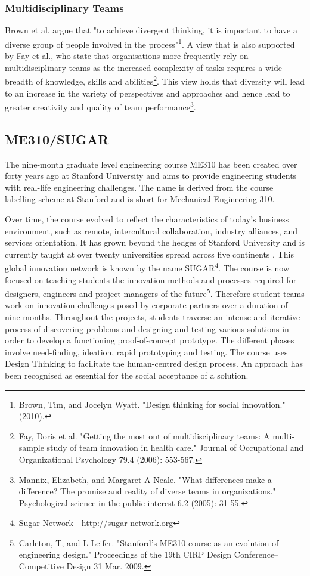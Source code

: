 \subsubsection{Multidisciplinary Teams}

Brown et al. argue that "to achieve divergent thinking, it is important to have a diverse group of people involved in the process"\footnote{Brown, Tim, and Jocelyn Wyatt. "Design thinking for social innovation." (2010).}. A view that is also supported by Fay et al., who state that organisations more frequently rely on multidisciplinary teams as the increased complexity of tasks requires a wide breadth of knowledge, skills and abilities\footnote{Fay, Doris et al. "Getting the most out of multidisciplinary teams: A multi-sample study of team innovation in health care." Journal of Occupational and Organizational Psychology 79.4 (2006): 553-567.}. This view holds that diversity will lead to an increase in the variety of perspectives and approaches and hence lead to greater creativity and quality of team performance\footnote{Mannix, Elizabeth, and Margaret A Neale. "What differences make a difference? The promise and reality of diverse teams in organizations." Psychological science in the public interest 6.2 (2005): 31-55.}.

\subsection{ME310/SUGAR}

The nine-month graduate level engineering course ME310 has been created over forty years ago at Stanford University and aims to provide engineering students with real-life engineering challenges. The name is derived from the course labelling scheme at Stanford and is short for Mechanical Engineering 310.

Over time, the course evolved to reflect the characteristics of today’s business environment, such as remote, intercultural collaboration, industry alliances, and services orientation.  It has grown beyond the hedges of Stanford University and is currently taught at over twenty universities spread across five continents . This global innovation network is known by the name SUGAR\footnote{Sugar Network - http://sugar-network.org }. The course is now focused on teaching students the innovation methods and processes required for designers, engineers and project managers of the future\footnote{Carleton, T, and L Leifer. "Stanford’s ME310 course as an evolution of engineering design." Proceedings of the 19th CIRP Design Conference–Competitive Design 31 Mar. 2009.}. Therefore student teams work on innovation challenges posed by corporate partners over a duration of nine months. Throughout the projects, students traverse an intense and iterative process of discovering problems and designing and testing various solutions in order to develop a functioning proof-of-concept prototype. The different phases involve need-finding, ideation, rapid prototyping and testing. The course uses Design Thinking to facilitate the human-centred design process. An approach has been recognised as essential for the social acceptance of a solution.

